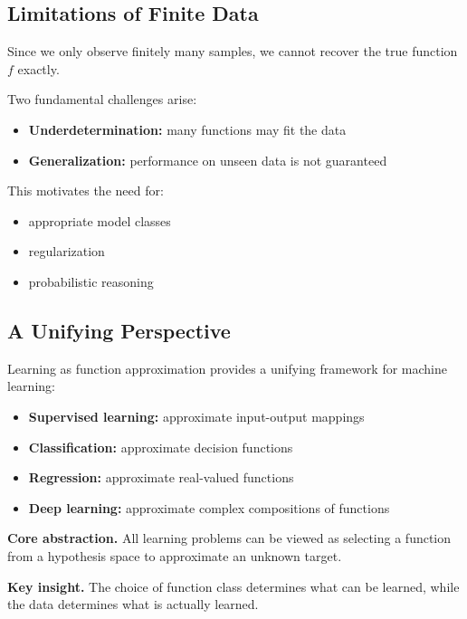 \subsection{Limitations of Finite Data}

Since we only observe finitely many samples, we cannot recover the true function $f$ exactly.

\medskip

\noindent
Two fundamental challenges arise:
\begin{itemize}
    \item \textbf{Underdetermination:} many functions may fit the data
    \item \textbf{Generalization:} performance on unseen data is not guaranteed
\end{itemize}

\medskip

\noindent
This motivates the need for:
\begin{itemize}
    \item appropriate model classes
    \item regularization
    \item probabilistic reasoning
\end{itemize}

\subsection{A Unifying Perspective}

Learning as function approximation provides a unifying framework for machine learning:

\begin{itemize}
    \item \textbf{Supervised learning:} approximate input-output mappings
    \item \textbf{Classification:} approximate decision functions
    \item \textbf{Regression:} approximate real-valued functions
    \item \textbf{Deep learning:} approximate complex compositions of functions
\end{itemize}

\medskip

\noindent
\textbf{Core abstraction.}  
All learning problems can be viewed as selecting a function from a hypothesis space to approximate an unknown target.

\medskip

\noindent
\textbf{Key insight.}  
The choice of function class determines what can be learned, while the data determines what is actually learned.

